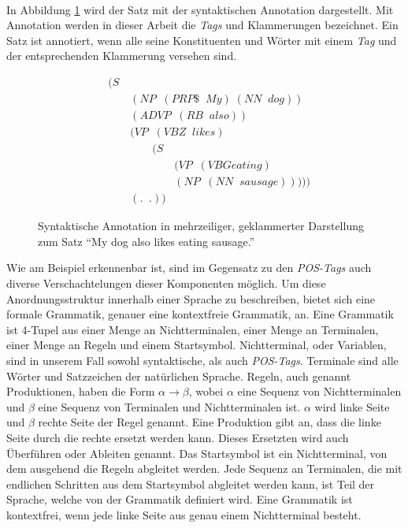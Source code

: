 \\
In Abbildung \ref{fig:multiline-annotated-dog-eating} wird der Satz mit der syntaktischen Annotation dargestellt. Mit Annotation werden in dieser Arbeit die \textit{Tags} und Klammerungen bezeichnet. Ein Satz ist annotiert, wenn alle seine Konstituenten und Wörter mit einem \textit{Tag} und der entsprechenden Klammerung versehen sind.\\
\begin{figure}
\begin{align}
&(S \nonumber \\ 
& \qquad (NP \;\;(PRP\$ \;\; My)\; (NN \;\; dog)) \nonumber \\
& \qquad (ADVP \;\;(RB \;\; also)) \nonumber \\
& \qquad (VP \;\;(VBZ \;\; likes) \nonumber \\
& \qquad \qquad (S \nonumber \\
& \qquad \qquad \qquad (VP \;\;(VBG eating) \nonumber \\
& \qquad \qquad \qquad (NP \;\;(NN \;\; sausage)))))\nonumber \\
& \qquad (. \;\; .)) \nonumber
\end{align}
\caption{Syntaktische Annotation in mehrzeiliger, geklammerter Darstellung zum Satz ``My dog also likes eating sausage.''}
\label{fig:multiline-annotated-dog-eating}
\end{figure}
Wie am Beispiel erkennenbar ist, sind im Gegensatz zu den \textit{POS-Tags} auch diverse Verschachtelungen dieser Komponenten möglich. Um diese Anordnungsstruktur innerhalb einer Sprache zu beschreiben, bietet sich eine formale Grammatik, genauer eine kontextfreie Grammatik, an.
Eine Grammatik ist 4-Tupel aus einer Menge an Nichtterminalen, einer Menge an Terminalen, einer Menge an Regeln und einem Startsymbol. Nichtterminal, oder Variablen, sind in unserem Fall sowohl syntaktische, als auch \textit{POS-Tags}. Terminale sind alle Wörter und Satzzeichen der natürlichen Sprache. Regeln, auch genannt Produktionen, haben die Form \( \alpha \to \beta\), wobei \(\alpha\) eine Sequenz von Nichtterminalen und \(\beta\) eine Sequenz von Terminalen und Nichtterminalen ist. \(\alpha\) wird linke Seite und \(\beta\) rechte Seite der Regel genannt. Eine Produktion gibt an, dass die linke Seite durch die rechte ersetzt werden kann. Dieses Ersetzten wird auch Überführen oder Ableiten genannt. Das Startsymbol ist ein Nichtterminal, von dem ausgehend die Regeln abgleitet werden. Jede Sequenz an Terminalen, die mit endlichen Schritten aus dem Startsymbol abgleitet werden kann, ist Teil der Sprache, welche von der Grammatik definiert wird. Eine Grammatik ist kontextfrei, wenn jede linke Seite aus genau einem Nichtterminal besteht. \cite[Kapitel 4]{ti}\\
